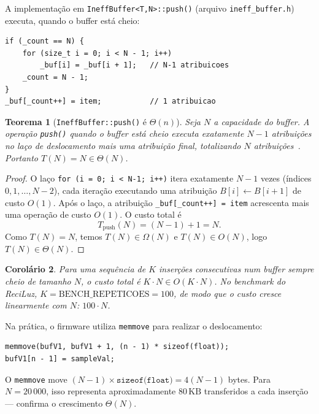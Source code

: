 \documentclass[12pt, a4paper]{article}
\newtheorem{teorema}{Teorema}
\newtheorem{corolario}[teorema]{Corolário}
\theoremstyle{definition}
\theoremstyle{remark}
\begin{document}
A implementação em \texttt{IneffBuffer<T,N>::push()} (arquivo
\texttt{ineff\_buffer.h}) executa, quando o buffer está cheio:

\begin{lstlisting}[caption={Núcleo de \texttt{IneffBuffer::push()} — O(n)}]
if (_count == N) {
    for (size_t i = 0; i < N - 1; i++)
        _buf[i] = _buf[i + 1];   // N-1 atribuicoes
    _count = N - 1;
}
_buf[_count++] = item;           // 1 atribuicao
\end{lstlisting}

\begin{teorema}[\texttt{IneffBuffer::push()} é $\Theta(n)$]
\label{thm:ineff-push}
Seja $N$ a capacidade do buffer. A operação \texttt{push()} quando o buffer
está cheio executa exatamente $N - 1$ atribuições no laço de deslocamento
mais uma atribuição final, totalizando $N$ atribuições~\cite{clrs,sedgewick}.
Portanto $T(N) = N \in \Theta(N)$.
\end{teorema}

\begin{proof}
O laço \texttt{for (i = 0; i < N-1; i++)} itera exatamente $N-1$ vezes
(índices $0, 1, \ldots, N-2$), cada iteração executando uma atribuição
$B[i] \leftarrow B[i+1]$ de custo $O(1)$.
Após o laço, a atribuição \texttt{\_buf[\_count++] = item} acrescenta
mais uma operação de custo $O(1)$.
O custo total é
\[
  T_{\text{push}}(N) = (N - 1) + 1 = N.
\]
Como $T(N) = N$, temos $T(N) \in \Omega(N)$ e $T(N) \in O(N)$,
logo $T(N) \in \Theta(N)$.
\end{proof}

\begin{corolario}
Para uma sequência de $K$ inserções consecutivas num buffer sempre cheio de
tamanho $N$, o custo total é $K \cdot N \in O(K \cdot N)$.
No benchmark do ReciLuz, $K = \text{BENCH\_REPETICOES} = 100$, de modo que o
custo cresce linearmente com $N$: $100 \cdot N$.
\end{corolario}

Na prática, o firmware utiliza \texttt{memmove} para realizar o deslocamento:

\begin{lstlisting}[caption={Benchmark V1 — \texttt{memmove} simula o shift O(n)}]
memmove(bufV1, bufV1 + 1, (n - 1) * sizeof(float));
bufV1[n - 1] = sampleVal;
\end{lstlisting}

O \texttt{memmove} move $(N-1) \times \texttt{sizeof(float)} = 4(N-1)$ bytes.
Para $N = 20\,000$, isso representa aproximadamente $80\,\text{KB}$
transferidos a cada inserção — confirma o crescimento $\Theta(N)$.
\end{document}

